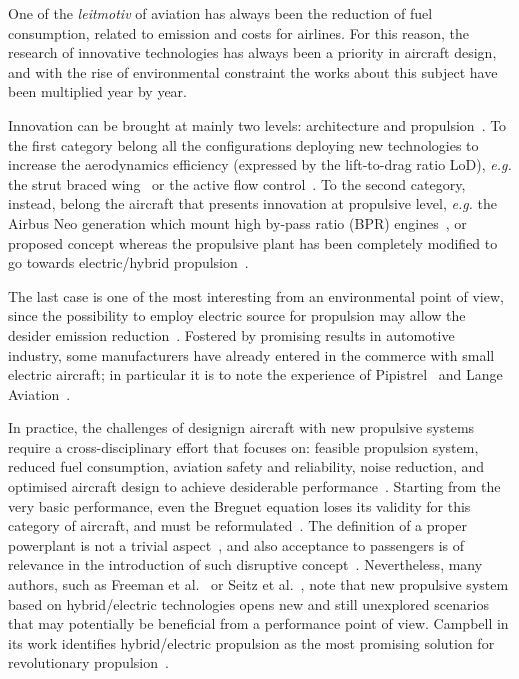 One of the \textit{leitmotiv} of aviation has always been the reduction of fuel consumption, related to emission and costs for airlines. 
For this reason, the research of innovative technologies has always been a priority in aircraft design, and with the rise of environmental constraint the works about this subject have been multiplied year by year.

Innovation can be brought at mainly two levels: architecture and propulsion~\cite{bib:isikveren_2014}. 
To the first category belong all the configurations deploying new technologies to increase the aerodynamics efficiency (expressed by the lift-to-drag ratio LoD), \textit{e.g.} the strut braced wing~\cite{bib:gur} or the active flow control~\cite{bib:iata, bib:iata_annex}.
To the second category, instead, belong the aircraft that presents innovation at propulsive level, \textit{e.g.} the Airbus Neo generation which mount high by-pass ratio (BPR) engines~\cite{bib:hughes}, or proposed concept whereas the propulsive plant has been completely modified to go towards electric/hybrid propulsion~\cite{bib:pornet_journal_he, bib:campbell_prop, bib:lambert}. 

The last case is one of the most interesting from an environmental point of view, since the possibility to employ electric source for propulsion may allow the desider emission reduction~\cite{bib:hepperle, bib:vanbogaert}.
Fostered by promising results in automotive industry, some manufacturers have already entered in the commerce with small electric aircraft; in particular it is to note the experience of Pipistrel~\cite{bib:pipistrel_alpha, bib:pipistrel_taurus} and Lange Aviation~\cite{bib:antares_main, bib:antares}. 

In practice, the challenges of designign aircraft with new propulsive systems require a cross-disciplinary effort that focuses on: feasible propulsion system, reduced fuel consumption, aviation safety and reliability, noise reduction, and optimised aircraft design to achieve desiderable performance~\cite{bib:liu_2018}. 
Starting from the very basic performance, even the Breguet equation loses its validity for this category of aircraft, and must be reformulated~\cite{bib:hepperle, bib:marwa}.
The definition of a proper powerplant is not a trivial aspect~\cite{bib:isikveren_celiner}, and also acceptance to passengers is of relevance in the introduction of such disruptive concept~\cite{bib:hornung}. 
Nevertheless, many authors, such as Freeman et al.~\cite{bib:freeman} or Seitz et al.~\cite{bib:seitz_2012}, note that new propulsive system based on hybrid/electric technologies opens new and still unexplored scenarios that may potentially be beneficial from a performance point of view. 
Campbell in its work identifies hybrid/electric propulsion as the most promising solution for revolutionary propulsion~\cite{bib:campbell_prop}.

